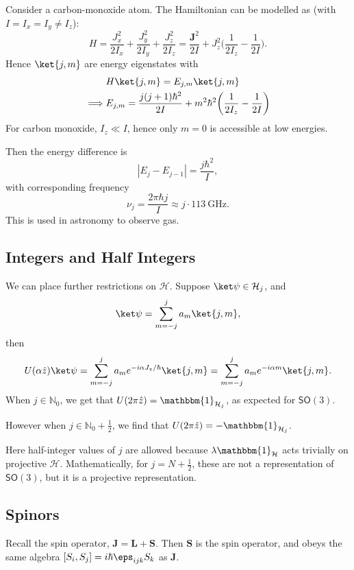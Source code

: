 \documentclass[12pt]{article}
\begin{document}
\begin{exbox}
	Consider a carbon-monoxide atom. The Hamiltonian can be modelled as (with $I = I_x = I_y \neq I_z$):
	\[
	H = \frac{J_x^2}{2I_x} + \frac{J_y^2}{2I_y} + \frac{J_z^2}{2I_z} = \frac{\mathbf{J}^2}{2I} + J_z^2\biggl( \frac{1}{2I_z} - \frac{1}{2I} \biggr).
	\]
	Hence $\ket{j,m}$ are energy eigenstates with
	\begin{align*}
		&H\ket{j,m} = E_{j,m}\ket{j,m} \\
		\implies& E_{j,m} = \frac{j(j+1)\hbar^2}{2I} + m^2\hbar^2 \biggl(\frac{1}{2I_z} - \frac{1}{2I} \biggr)
	\end{align*}
	For carbon monoxide, $I_z \ll I$, hence only $m = 0$ is accessible at low energies.

	Then the energy difference is
	\[
	|E_j - E_{j-1}| = \frac{j\hbar^2}{I},
	\]
	with corresponding frequency
	\[
		\nu_j = \frac{2 \pi \hbar j}{I} \approx j \cdot \qty{113}{\giga\hertz}.
	\]
	This is used in astronomy to observe gas.
\end{exbox}

\subsection{Integers and Half Integers}
\label{sub:ints_half_ints}

We can place further restrictions on $\mathcal{H}$. Suppose $\ket \psi \in \mathcal{H}_j$, and
\[
	\ket \psi = \sum_{m = -j}^{j} a_m \ket{j,m},
\]
then
\[
	U(\alpha \hat z) \ket \psi = \sum_{m = -j}^{j} a_m e^{-i\alpha J_z/\hbar} \ket{j,m} = \sum_{m = -j}^{j} a_m e^{-i \alpha m} \ket{j,m}.
\]
When $j \in \mathbb{N}_0$, we get that $U(2 \pi \hat z) = \mathbbm{1}_{\mathcal{H}_j}$, as expected for $\mathsf{SO}(3)$.

However when $j \in \mathbb{N}_0 + \frac{1}{2}$, we find that $U(2\pi \hat z) = -\mathbbm{1}_{\mathcal{H}_j}$.

Here half-integer values of $j$ are allowed because $\lambda \mathbbm{1}_{\mathcal{H}}$ acts trivially on projective $\mathcal{H}$. Mathematically, for $j = N + \frac{1}{2}$, these are not a representation of $\mathsf{SO}(3)$, but it is a projective representation.

\subsection{Spinors}
\label{sub:spinors}

Recall the spin operator, $\mathbf{J} = \mathbf{L} + \mathbf{S}$. Then $\mathbf{S}$ is the spin operator, and obeys the same algebra $[S_i, S_j] = i \hbar \eps_{ijk} S_k$ as $\mathbf{J}$.
\end{document}
